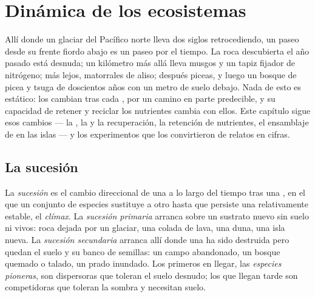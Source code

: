\chapter{Dinámica de los ecosistemas}\label{ch:b1:ecosystem-dynamics}

Allí donde un glaciar del Pacífico norte lleva dos siglos retrocediendo, un
paseo desde su frente fiordo abajo es un paseo por el tiempo. La roca
descubierta el año pasado está desnuda; un kilómetro más allá lleva musgos y
un tapiz fijador de nitrógeno; más lejos, matorrales de aliso; después
piceas, y luego un bosque de picea y tsuga de doscientos años con un metro
de suelo debajo. Nada de esto es estático: los  cambian tras cada
, por un camino en parte predecible, y su capacidad de retener y
reciclar los nutrientes cambia con ellos. Este capítulo sigue esos cambios
--- la , la  y la recuperación, la retención de
nutrientes, el ensamblaje de  en las islas --- y los experimentos
que los convirtieron de relatos en cifras.

\section{La sucesión}

\begin{definition}\label{def:b1:ecosystem-dynamics:succession}
La \emph{sucesión} es el cambio direccional de una  a lo largo del
tiempo tras una , en el que un conjunto de especies sustituye a
otro hasta que persiste una  relativamente estable, el
\emph{clímax}. La \emph{sucesión primaria} arranca sobre un sustrato nuevo
sin suelo ni  vivos: roca dejada por un glaciar, una colada de
lava, una duna, una isla nueva. La \emph{sucesión secundaria} arranca allí
donde una  ha sido destruida pero quedan el suelo y su banco de
semillas: un campo abandonado, un bosque quemado o talado, un prado
inundado. Los primeros en llegar, las \emph{especies pioneras}, son
dispersoras que toleran el suelo desnudo; los que llegan tarde son
competidoras que toleran la sombra y necesitan suelo.
\end{definition}


